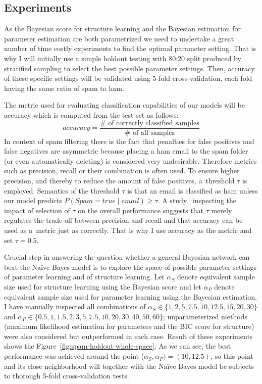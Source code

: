 \documentclass[english,cover]{fitthesis} %
\newcommand{\todo}[1]{{\color{red}#1}}
\begin{document}
\subsection{Experiments}
As the Bayesian score for structure learning and the Bayesian estimation for parameter estimation are both parametrized we need to undertake a great number of time costly experiments to find the optimal parameter setting. That is why I will initially use a simple holdout testing with 80:20 split produced by stratified sampling to select the best possible parameter settings. Then, accuracy of these specific settings \todo{will be validated using 5-fold cross-validation, each fold having the same ratio of spam to ham}.

The metric used for evaluating  classification capabilities of our models will be accuracy which is computed from the test set as follows:
$$accuracy = \frac{\# \text{ of correctly classified samples}}{\# \text{ of all samples}}$$
In context of spam filtering there is the fact that penalties for false positives and false negatives are asymmetric because placing a ham email to the spam folder (or even automatically deleting) is considered very undesirable. Therefore metrics such as precision, recall or their combination is often used. To ensure higher precision, and thereby to reduce the amount of false positives, a~threshold $\tau$ is employed. Semantics of the threshold $\tau$ is that an email is classified as ham unless our model predicts $P(Spam = true \mid email) \geq \tau$.
A study~\cite{androutsopoulos00_spam} inspecting the impact of selection of $\tau$ on the overall performance suggests that $\tau$ merely regulates the trade-off between precision and recall and that accuracy can be used as a~metric just as correctly. That is why I use accuracy as the metric and set $\tau = 0.5$.

\medskip
Crucial step in answering the question whether a general Bayesian network can beat the Naïve Bayes model is to explore the space of possible parameter settings of parameter learning and of structure learning. Let $\alpha_S$ denote equivalent sample size used for structure learning using the Bayesian score and let $\alpha_P$ denote equivalent sample size used for parameter learning using the Bayesian estimation. I have manually inspected all combinations of $\alpha_S \in \lbrace 1, 2, 5, 7.5, 10, 12.5, 15, 20, 30\rbrace$ and $\alpha_P \in \lbrace 0.5, 1, 1.5, 2, 3, 5, 7.5, 10, 20, 30, 40, 50, 60 \rbrace$; unparameterized methods (maximum likelihood estimation for parameters and the BIC score for structure) were also considered but outperformed in each case. Result of these experiments shows the Figure~\ref{fig:spam-holdout-whole-space}. As we can see, the best performance was achieved around the point ($\alpha_S, \alpha_P) = (10, 12.5)$, so this point and its close neighborhood will together with the Naïve Bayes model be subjects to thorough 5-fold cross-validation tests.
\end{document}
